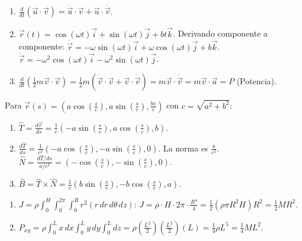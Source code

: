 \begin{sol}
\begin{enumerate}
    \item $\frac{d}{dt} (\vec{u} \cdot \vec{v}) = \dot{\vec{u}} \cdot \vec{v} + \vec{u} \cdot \dot{\vec{v}}$.
    \item $\vec{r}(t) = \cos(\omega t)\vec{i} + \sin(\omega t)\vec{j} + bt\vec{k}$. 
    Derivando componente a componente:
    $\dot{\vec{r}} = -\omega\sin(\omega t)\vec{i} + \omega\cos(\omega t)\vec{j} + b\vec{k}$.
    $\ddot{\vec{r}} = -\omega^2\cos(\omega t)\vec{i} - \omega^2\sin(\omega t)\vec{j}$.
    \item $\frac{d}{dt} (\frac{1}{2} m \vec{v} \cdot \vec{v}) = \frac{1}{2} m (\dot{\vec{v}} \cdot \vec{v} + \vec{v} \cdot \dot{\vec{v}}) = m \vec{v} \cdot \dot{\vec{v}} = m \vec{v} \cdot \vec{a} = P$ (Potencia).
\end{enumerate}
\end{sol}

\begin{sol}
Para $\vec{r}(s) = \left( a \cos(\frac{s}{c}), a \sin(\frac{s}{c}), \frac{bs}{c} \right)$ con $c = \sqrt{a^2+b^2}$:
\begin{enumerate}
    \item $\hat{T} = \frac{d\vec{r}}{ds} = \frac{1}{c} \left( -a\sin(\frac{s}{c}), a\cos(\frac{s}{c}), b \right)$.
    \item $\frac{d\hat{T}}{ds} = \frac{1}{c^2} (-a\cos(\frac{s}{c}), -a\sin(\frac{s}{c}), 0)$. La norma es $\frac{a}{c^2}$.
    $\hat{N} = \frac{d\hat{T}/ds}{a/c^2} = (-\cos(\frac{s}{c}), -\sin(\frac{s}{c}), 0)$.
    \item $\hat{B} = \hat{T} \times \hat{N} = \frac{1}{c} (b\sin(\frac{s}{c}), -b\cos(\frac{s}{c}), a)$.
\end{enumerate}
\end{sol}

\begin{sol}
\begin{enumerate}
    \item $J = \rho \int_0^H \int_0^{2\pi} \int_0^R r^2 (r \, dr \, d\theta \, dz)$: 
    $J = \rho \cdot H \cdot 2\pi \cdot \frac{R^4}{4} = \frac{1}{2} (\rho \pi R^2 H) R^2 = \frac{1}{2} M R^2$.
    \item $P_{xy} = \rho \int_0^L x \, dx \int_0^L y \, dy \int_0^L dz = \rho (\frac{L^2}{2})(\frac{L^2}{2})(L) = \frac{1}{4} \rho L^5 = \frac{1}{4} ML^2$.
\end{enumerate}
\end{sol}

